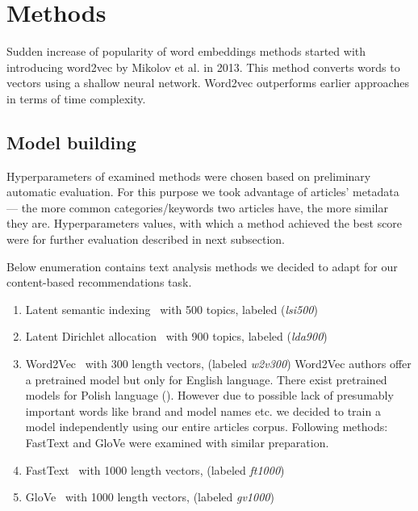 \documentclass[twoside,twocolumn]{article}
\begin{document}
	\section{Methods}
	Sudden increase of popularity of word embeddings methods started with introducing word2vec by Mikolov et al. in 2013\cite{word2vec}. This method converts words to vectors using a shallow neural network. Word2vec outperforms earlier approaches in terms of time complexity.

	\subsection{Model building}
	
	Hyperparameters of examined methods were chosen based on preliminary automatic evaluation. For this purpose we took advantage of articles' metadata --- the more common categories/keywords two articles have, the more similar they are. Hyperparameters values, with which a method achieved the best score were for further evaluation described in next subsection.
	
	Below enumeration contains text analysis methods we decided to adapt for our content-based recommendations task.
	\begin{enumerate}
		\item Latent semantic indexing~\cite{lsa} with 500 topics, labeled (\emph{lsi500})
		\item Latent Dirichlet allocation~\cite{lda} with 900 topics, labeled (\emph{lda900})
		\item Word2Vec~\cite{word2vec} with 300 length vectors, (labeled \emph{w2v300})  %
			Word2Vec authors offer a pretrained model but only for English language. There exist pretrained models for Polish language (\cite{pias}). However due to possible lack of presumably important words like brand and model names etc. we decided to train a model independently using our entire articles corpus. Following methods: FastText and GloVe were examined with similar preparation.
		\item FastText~\cite{fasttext} with 1000 length vectors, (labeled \emph{ft1000})
		\item GloVe~\cite{glove} with 1000 length vectors, (labeled \emph{gv1000})
	\end{enumerate}
	
\end{document}
